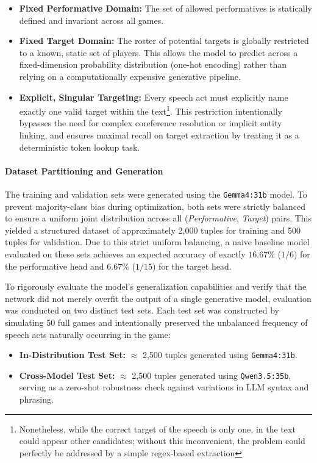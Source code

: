 \begin{itemize}
    \item \textbf{Fixed Performative Domain:} The set of allowed performatives is statically defined and invariant across all games.
    \item \textbf{Fixed Target Domain:} The roster of potential targets is globally restricted to a known, static set of players. This allows the model to predict across a fixed-dimension probability distribution (one-hot encoding) rather than relying on a computationally expensive generative pipeline.
    \item \textbf{Explicit, Singular Targeting:} Every speech act must explicitly name exactly one valid target within the text\footnote{Nonetheless, while the correct target of the  speech is only one, in the text could appear other candidates; without this inconvenient, the problem could perfectly be addressed by a simple regex-based extraction}. This restriction intentionally bypasses the need for complex coreference resolution or implicit entity linking, and ensures maximal recall on target extraction by treating it as a deterministic token lookup task.
\end{itemize}


\paragraph{Dataset Partitioning and Generation}
The training and validation sets were generated using the \texttt{Gemma4:31b} model. To prevent majority-class bias during optimization, both sets were strictly balanced to ensure a uniform joint distribution across all (\textit{Performative}, \textit{Target}) pairs. This yielded a structured dataset of approximately 2,000 tuples for training and 500 tuples for validation. Due to this strict uniform balancing, a naive baseline model evaluated on these sets achieves an expected accuracy of exactly $16.67\%$ ($1/6$) for the performative head and $6.67\%$ ($1/15$) for the target head.

To rigorously evaluate the model's generalization capabilities and verify that the network did not merely overfit the output of a single generative model, evaluation was conducted on two distinct test sets. Each test set was constructed by simulating 50 full games and intentionally preserved the unbalanced frequency of speech acts naturally occurring in the game:
\begin{itemize}
    \item \textbf{In-Distribution Test Set:} $\approx$ 2,500 tuples generated using \texttt{Gemma4:31b}.
    \item \textbf{Cross-Model Test Set:} $\approx$ 2,500 tuples generated using \texttt{Qwen3.5:35b}, serving as a zero-shot robustness check against variations in LLM syntax and phrasing.
\end{itemize}


